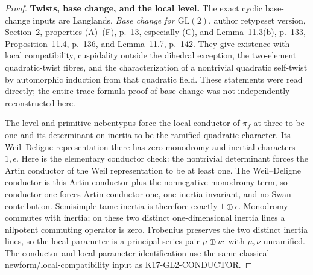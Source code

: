 \documentclass[11pt,a4paper]{article}
\theoremstyle{definition}
\renewcommand{\paragraph}[1]{\par\smallskip\noindent\textbf{#1}\quad\ignorespaces}
\begin{document}
\begin{proof}
\paragraph{Twists, base change, and the local level.}
The exact cyclic base-change inputs are Langlands,
\emph{Base change for $\mathrm{GL}(2)$}, author retypeset version,
Section~2, properties (A)--(F), p.~13, especially (C), and
Lemma~11.3(b), p.~133, Proposition~11.4, p.~136, and
Lemma~11.7, p.~142. They give existence with local compatibility,
cuspidality outside the dihedral exception, the two-element
quadratic-twist fibres, and the characterization of a nontrivial
quadratic self-twist by automorphic induction from that quadratic
field. These statements were read directly; the entire trace-formula
proof of base change was not independently reconstructed here.

The level and primitive nebentypus force the local conductor of
$\pi_f$ at three to be one and its determinant on inertia to be
the ramified quadratic character. Its Weil--Deligne representation
there has zero monodromy and inertial characters $1,\epsilon$.
Here is the elementary conductor check: the nontrivial determinant
forces the Artin conductor of the Weil representation to be at
least one. The Weil--Deligne conductor is this Artin conductor
plus the nonnegative monodromy term, so conductor one forces
Artin conductor one, one inertia invariant, and no Swan
contribution. Semisimple tame inertia is therefore exactly
$1\oplus\epsilon$. Monodromy commutes with inertia; on these
two distinct one-dimensional inertia lines a nilpotent commuting
operator is zero. Frobenius preserves the two distinct inertia lines,
so the local parameter is a principal-series pair
$\mu\oplus\nu\epsilon$ with $\mu,\nu$ unramified.
The conductor and local-parameter identification use the same
classical newform/local-compatibility input as K17-GL2-CONDUCTOR.


\end{proof}
\end{document}

